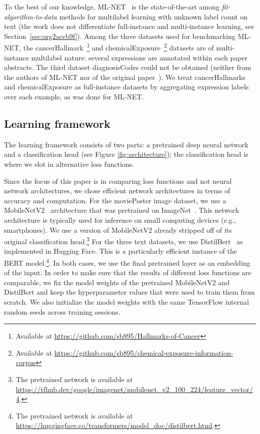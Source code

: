 To the best of our knowledge, ML-NET~\cite{multitaskLabel} is the state-of-the-art among \emph{fit-algorithm-to-data} methods for multilabel learning with unknown label count on text (the work does not differentiate full-instance and multi-instance learning, see Section~\ref{sec:org2aceb9f}). Among the three datasets used for benchmarking ML-NET, the cancerHallmark~\citep{cancerHallmarks}\footnote{Available at \url{https://github.com/sb895/Hallmarks-of-Cancer}} and chemicalExposure~\citep{chemExposure}\footnote{Available at \url{https://github.com/sb895/chemical-exposure-information-corpus}} datasets are of multi-instance multilabel nature: several expressions are annotated within each paper abstracts. The third dataset diagnosisCodes could not be obtained (neither from the authors of ML-NET nor of the original paper~\cite{diagnosisCode}). We treat cancerHallmarks and chemicalExposure as full-instance datasets by aggregating expression labels over each example, as was done for ML-NET.

\subsection{Learning framework}

The learning framework consists of two parts: a pretrained deep neural network and a classification head (see Figure \ref{fig:architecture}); the classification head is where we slot in alternative loss functions.

Since the focus of this paper is in comparing loss functions and not neural network architectures, we chose efficient network architectures in terms of accuracy and computation.
For the moviePoster image dataset, we use a MobileNetV2~\cite{mobileNet} architecture that was pretrained on ImageNet~\cite{imagenet}. This network architecture is typically used for inference on small computing devices (e.g., smartphones). We use a version of MobileNetV2 already stripped off of its original classification head.\footnote{The pretrained network is available at \url{https://tfhub.dev/google/imagenet/mobilenet_v2_100_224/feature_vector/4}.}
For the three text datasets, we use DistilBert~\cite{distilBert} as implemented in Hugging Face. This is a particularly efficient instance of the BERT model.\footnote{The pretrained network is available at \url{https://huggingface.co/transformers/model_doc/distilbert.html}.}.
In both cases, we use the final pretrained layer as an embedding of the input. In order to make sure that the results of different loss functions are comparable, we fix the model weights of the pretrained MobileNetV2 and DistilBert and keep the hyperparameter values that were used to train them from scratch. We also initialize the model weights with the same TensorFlow internal random seeds across training sessions.

